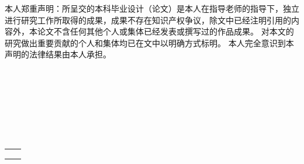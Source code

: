 
\begin{declarationzh}
	
本人郑重声明：所呈交的本科毕业设计（论文）是本人在指导老师的指导下，独立进行研究工作所取得的成果，成果不存在知识产权争议，除文中已经注明引用的内容外，本论文不含任何其他个人或集体已经发表或撰写过的作品成果。
对本文的研究做出重要贡献的个人和集体均已在文中以明确方式标明。
本人完全意识到本声明的法律结果由本人承担。
\\
\\
\\
\\
\\
\\
\\
\\
	
	\vspace{30pt}
	\begin{tabular}{ll}
		\makebox[4em][s]{作者签名：刘东林} & \makebox[100pt][c]{  } \\
		\\
		\makebox[2em][s]{日期:}	 &
		\makebox[100pt][c]{\qquad2025年\quad5月\quad18日} \\
	\end{tabular}

	
	
\end{declarationzh}
